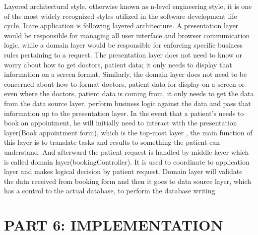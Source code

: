 \documentclass[a4paper,12pt]{report}
\begin{document}
Layered architectural style, otherwise known as n-level engineering style, it is one of the most widely recognized styles utilized in the software development life cycle.  Icare application is following layered architecture. A presentation layer would be responsible for managing all user interface and browser communication logic, while a domain layer would be responsible for enforcing specific business rules pertaining to a request. The presentation layer does not need to know or worry about how to get doctors, patient data; it only needs to display that information on a screen format. Similarly, the domain layer does not need to be concerned about how to format doctors, patient data for display on a screen or even where the doctors, patient  data is coming from, it only needs to get the data from the data source layer, perform business logic against the data and pass that information up to the presentation layer.  In the event that a patient’s needs to book an appointment, he will initially need to interact with the presentation  layer(Book appointment form), which is the top-most layer , the main function of this layer is to translate tasks and results to something the patient  can understand. And afterward the patient request is handled by middle layer which is called domain layer(bookingController). It is used to coordinate to application layer and makes logical decision by patient request. Domain layer will validate the data received from booking form and then it goes to data source layer, which has a control to the actual database, to perform the database writing.


\chapter*{PART 6: IMPLEMENTATION}
\end{document}
